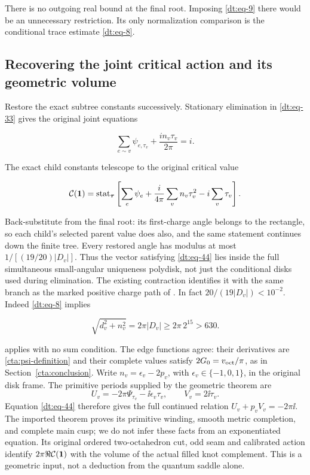 There is no outgoing real bound at the final root. Imposing \eqref{dt:eq-9} there
would be an unnecessary restriction. Its only normalization comparison
is the conditional trace estimate \eqref{dt:eq-8}.

\subsection{Recovering the joint critical action and its geometric volume}\label{dt:sec-7}

Restore the exact subtree constants successively. Stationary
elimination in \eqref{dt:eq-33} gives the original joint equations

\begin{equation}\label{dt:eq-44}
\sum_{e\sim v}\psi_{e,\tau_v}
                      +\frac{in_v\tau_v}{2\pi}=i.
\end{equation}

The exact child constants telescope to the original critical value

\begin{equation}\label{dt:eq-45}
\mathcal C(\mathbf1)=\operatorname{stat}_{\boldsymbol\tau}
 \left[\sum_e\psi_e+
       \frac{i}{4\pi}\sum_vn_v\tau_v^2-i\sum_v\tau_v\right].
\end{equation}

Back-substitute from the final root: its first-charge angle belongs to
the rectangle, so each child's selected parent value does also, and
the same statement continues down the finite tree. Every restored angle
has modulus at most \(1/[(19/20)|D_v|]\). Thus the vector satisfying
\eqref{dt:eq-44} lies inside the full simultaneous small-angular uniqueness
polydisk, not just the conditional disks used during elimination.
The existing contraction identifies it with the same branch as the
marked positive charge path of \cite[Theorem~1.1]{Geometry}. In fact
\(20/(19|D_v|)<10^{-2}\). Indeed
\eqref{dt:eq-8} implies

\begin{equation}\label{dt:eq-46}
\sqrt{d_v^2+n_v^2}=2\pi|D_v|\ge 2\pi\,2^{15}>630.
\end{equation}

\cite[Theorem~1.1]{Geometry} applies with no sum condition.
The edge functions agree: their derivatives are \eqref{cta:psi-definition} and
their complete values satisfy \(2G_0=v_{\rm oct}/\pi\), as in
Section~\ref{cta:conclusion}. Write \(n_v=\epsilon_v-2p_v\), with
\(\epsilon_v\in\{-1,0,1\}\), in the original disk frame. The
primitive periods supplied by the geometric theorem are
\[
 U_v=-2\pi\Psi_{\tau_v}-\ii\epsilon_v\tau_v,
 \qquad V_v=2\ii\tau_v.
\]
Equation \eqref{dt:eq-44} therefore gives the full continued relation
\(U_v+p_vV_v=-2\pi\ii\). The imported theorem proves its primitive
winding, smooth metric completion, and complete main cusp; we do not
infer these facts from an exponentiated equation.
Its original ordered two-octahedron cut, odd seam and calibrated action identify \(2\pi\Re\mathcal C(\mathbf1)\) with the volume of the actual
filled knot complement. This is a geometric input, not a deduction
from the quantum saddle alone.

